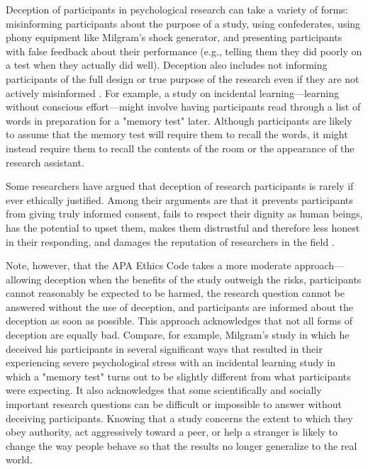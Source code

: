 Deception of participants in psychological research can take a variety of forms: misinforming participants about the purpose of a study, using confederates, using phony equipment like Milgram's shock generator, and presenting participants with false feedback about their performance (e.g., telling them they did poorly on a test when they actually did well). Deception also includes not informing participants of the full design or true purpose of the research even if they are not actively misinformed \citep{sieber_deception_1995}. For example, a study on incidental learning---learning without conscious effort---might involve having participants read through a list of words in preparation for a "memory test" later. Although participants are likely to assume that the memory test will require them to recall the words, it might instead require them to recall the contents of the room or the appearance of the research assistant.


Some researchers have argued that deception of research participants is rarely if ever ethically justified. Among their arguments are that it prevents participants from giving truly informed consent, fails to respect their dignity as human beings, has the potential to upset them, makes them distrustful and therefore less honest in their responding, and damages the reputation of researchers in the field \citep{baumrind_research_1985}.


Note, however, that the APA Ethics Code takes a more moderate approach---allowing deception when the benefits of the study outweigh the risks, participants cannot reasonably be expected to be harmed, the research question cannot be answered without the use of deception, and participants are informed about the deception as soon as possible. This approach acknowledges that not all forms of deception are equally bad. Compare, for example, Milgram's study in which he deceived his participants in several significant ways that resulted in their experiencing severe psychological stress with an incidental learning study in which a "memory test" turns out to be slightly different from what participants were expecting. It also acknowledges that some scientifically and socially important research questions can be difficult or impossible to answer without deceiving participants. Knowing that a study concerns the extent to which they obey authority, act aggressively toward a peer, or help a stranger is likely to change the way people behave so that the results no longer generalize to the real world.



